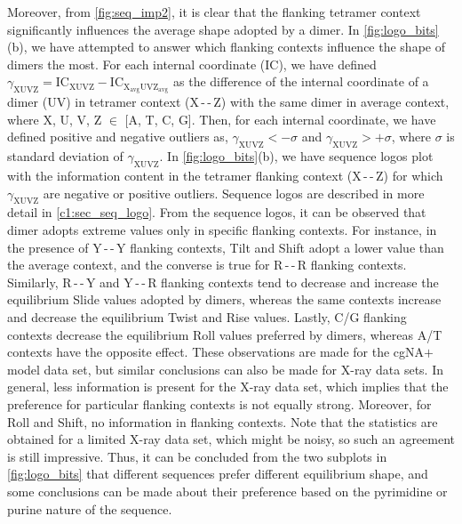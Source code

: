 Moreover, from \cref{fig:seq_imp2}, it is clear that the flanking tetramer context significantly influences the average shape adopted by a dimer.
In \cref{fig:logo_bits}(b), we have attempted to answer which flanking contexts influence the shape of dimers the most. 
For each internal coordinate (IC), we have defined 
$\gamma_{\text{XUVZ}}= \text{IC}_{\text{XUVZ}} - \text{IC}_{\text{X}_{\text{avg}}\text{UV}\text{Z}_{\text{avg}}}$ as the difference of the internal coordinate of a dimer (UV) in tetramer context (X\,-\,-\,Z) with the same dimer in average context, where X, U, V, Z $\in$ [A, T, C, G]. 
Then, for each internal coordinate, we have defined positive and negative outliers as, $ \gamma_{\text{XUVZ}} < -\sigma$
and $ \gamma_{\text{XUVZ}} > +\sigma$, 
where $\sigma$ is standard deviation of $\gamma_{\text{XUVZ}}$.
In \cref{fig:logo_bits}(b), we have sequence logos plot with the information content in the tetramer flanking context (X\,-\,-\,Z) for which $\gamma_{\text{XUVZ}}$ are negative or positive outliers.
Sequence logos are described in more detail in \cref{c1:sec_seq_logo}. 
From the sequence logos, it can be observed that dimer adopts extreme values only in specific flanking contexts. 
For instance, in the presence of Y\,-\,-\,Y flanking contexts, Tilt and Shift adopt a lower value than the average context, and the converse is true for R\,-\,-\,R flanking contexts.
Similarly, R\,-\,-\,Y and Y\,-\,-\,R flanking contexts tend to decrease and increase the equilibrium Slide values adopted by dimers, whereas the same contexts increase and decrease the equilibrium Twist and Rise values. 
Lastly, C/G flanking contexts decrease the equilibrium Roll values preferred by dimers, whereas A/T contexts have the opposite effect.
These observations are made for the cgNA$+$ model data set, but similar conclusions can also be made for X-ray data sets. 
In general, less information is present for the X-ray data set, which implies that the preference for particular flanking contexts is not equally strong. 
Moreover, for Roll and Shift, no information in flanking contexts. 
Note that the statistics are obtained for a limited X-ray data set, which might be noisy, so such an agreement is still impressive.
Thus, it can be concluded from the two subplots in \cref{fig:logo_bits} that different sequences prefer different equilibrium shape, and some conclusions can be made about their preference based on the pyrimidine or purine nature of the sequence.

